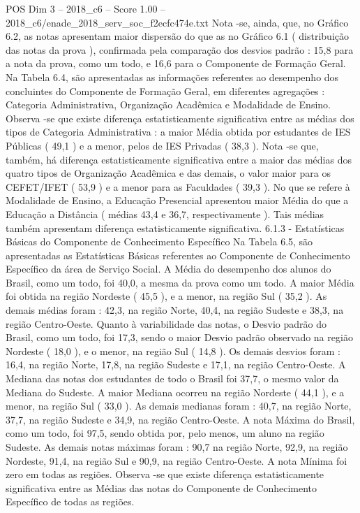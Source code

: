 \begin{textsample}{POS Dim 3 – 2018\_c6 – Score 1.00 – 2018\_c6/enade\_2018\_serv\_soc\_f2ecfc474e.txt}
Nota -se, ainda, que, no Gráfico 6.2, as notas apresentam maior dispersão do que as no Gráfico 6.1 ( distribuição das notas da prova ), confirmada pela comparação dos desvios padrão : 15,8 para a nota da prova, como um todo, e 16,6 para o Componente de Formação Geral.
Na Tabela 6.4, são apresentadas as informações referentes ao desempenho dos concluintes do Componente de Formação Geral, em diferentes agregações : Categoria Administrativa, Organização Acadêmica e Modalidade de Ensino.
Observa -se que existe diferença estatisticamente significativa entre as médias dos tipos de Categoria Administrativa : a maior Média obtida por estudantes de IES Públicas ( 49,1 ) e a menor, pelos de IES Privadas ( 38,3 ).
Nota -se que, também, há diferença estatisticamente significativa entre a maior das médias dos quatro tipos de Organização Acadêmica e das demais, o valor maior para os CEFET/IFET ( 53,9 ) e a menor para as Faculdades ( 39,3 ).
No que se refere à Modalidade de Ensino, a Educação Presencial apresentou maior Média do que a Educação a Distância ( médias 43,4 e 36,7, respectivamente ).
Tais médias também apresentam diferença estatisticamente significativa. 6.1.3 - Estatísticas Básicas do Componente de Conhecimento Específico Na Tabela 6.5, são apresentadas as Estatísticas Básicas referentes ao Componente de Conhecimento Específico da área de Serviço Social.
A Média do desempenho dos alunos do Brasil, como um todo, foi 40,0, a mesma da prova como um todo.
A maior Média foi obtida na região Nordeste ( 45,5 ), e a menor, na região Sul ( 35,2 ).
As demais médias foram : 42,3, na região Norte, 40,4, na região Sudeste e 38,3, na região Centro-Oeste.
Quanto à variabilidade das notas, o Desvio padrão do Brasil, como um todo, foi 17,3, sendo o maior Desvio padrão observado na região Nordeste ( 18,0 ), e o menor, na região Sul ( 14,8 ).
Os demais desvios foram : 16,4, na região Norte, 17,8, na região Sudeste e 17,1, na região Centro-Oeste.
A Mediana das notas dos estudantes de todo o Brasil foi 37,7, o mesmo valor da Mediana do Sudeste.
A maior Mediana ocorreu na região Nordeste ( 44,1 ), e a menor, na região Sul ( 33,0 ).
As demais medianas foram : 40,7, na região Norte, 37,7, na região Sudeste e 34,9, na região Centro-Oeste.
A nota Máxima do Brasil, como um todo, foi 97,5, sendo obtida por, pelo menos, um aluno na região Sudeste.
As demais notas máximas foram : 90,7 na região Norte, 92,9, na região Nordeste, 91,4, na região Sul e 90,9, na região Centro-Oeste.
A nota Mínima foi zero em todas as regiões.
Observa -se que existe diferença estatisticamente significativa entre as Médias das notas do Componente de Conhecimento Específico de todas as regiões.

\end{textsample}
